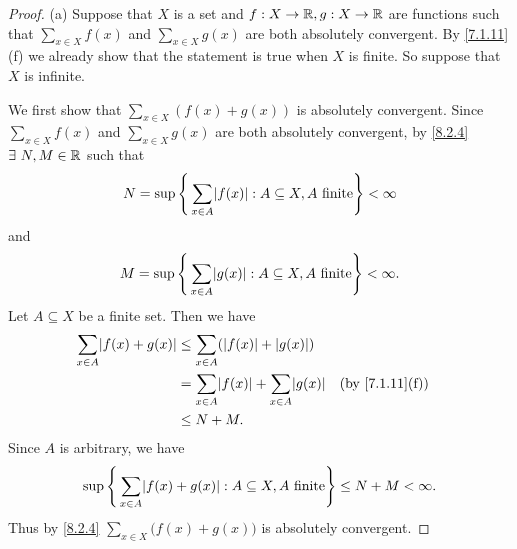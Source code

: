 \begin{proof}{(a)}
  Suppose that \(X\) is a set and \(f : X \to \mathbb{R}, g : X \to \mathbb{R}\) are functions such that \(\sum_{x \in X} f(x)\) and \(\sum_{x \in X} g(x)\) are both absolutely convergent.
  By \cref{7.1.11}(f) we already show that the statement is true when \(X\) is finite.
  So suppose that \(X\) is infinite.

  We first show that \(\sum_{x \in X} (f(x) + g(x))\) is absolutely convergent.
  Since \(\sum_{x \in X} f(x)\) and \(\sum_{x \in X} g(x)\) are both absolutely convergent, by \cref{8.2.4} \(\exists\ N, M \in \mathbb{R}\) such that
  \[
    N = \sup\Bigg\{\sum_{x \in A} \abs{f(x)} : A \subseteq X, A \text{ finite}\Bigg\} < \infty
  \]
  and
  \[
    M = \sup\Bigg\{\sum_{x \in A} \abs{g(x)} : A \subseteq X, A \text{ finite}\Bigg\} < \infty.
  \]
  Let \(A \subseteq X\) be a finite set.
  Then we have
  \begin{align*}
    \sum_{x \in A} \abs{f(x) + g(x)} & \leq \sum_{x \in A} (\abs{f(x)} + \abs{g(x)})                                             \\
                                     & = \sum_{x \in A} \abs{f(x)} + \sum_{x \in A} \abs{g(x)} &  & \text{(by \cref{7.1.11}(f))} \\
                                     & \leq N + M.
  \end{align*}
  Since \(A\) is arbitrary, we have
  \[
    \sup\Bigg\{\sum_{x \in A} \abs{f(x) + g(x)} : A \subseteq X, A \text{ finite}\Bigg\} \leq N + M < \infty.
  \]
  Thus by \cref{8.2.4} \(\sum_{x \in X} \big(f(x) + g(x)\big)\) is absolutely convergent.


\end{proof}
